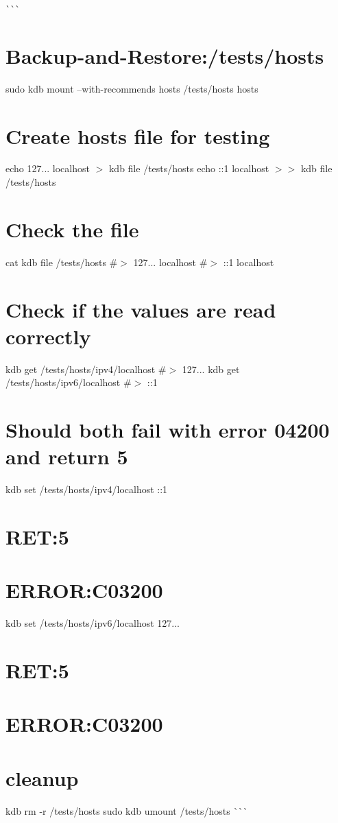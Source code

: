 \`{}\`{}\`{} \hypertarget{autotoc_md268_autotoc_md275}{}\section{Backup-\/and-\/\+Restore\+:/tests/hosts}\label{autotoc_md268_autotoc_md275}
sudo kdb mount --with-\/recommends hosts /tests/hosts hosts\hypertarget{autotoc_md268_autotoc_md276}{}\section{Create hosts file for testing}\label{autotoc_md268_autotoc_md276}
echo \textquotesingle{}127... localhost\textquotesingle{} $>$ {\ttfamily kdb file /tests/hosts} echo \textquotesingle{}\+::1 localhost\textquotesingle{} $>$$>$ {\ttfamily kdb file /tests/hosts}\hypertarget{autotoc_md268_autotoc_md277}{}\section{Check the file}\label{autotoc_md268_autotoc_md277}
cat {\ttfamily kdb file /tests/hosts} \#$>$ 127... localhost \#$>$ \+::1 localhost\hypertarget{autotoc_md268_autotoc_md278}{}\section{Check if the values are read correctly}\label{autotoc_md268_autotoc_md278}
kdb get /tests/hosts/ipv4/localhost \#$>$ 127... kdb get /tests/hosts/ipv6/localhost \#$>$ \+::1\hypertarget{autotoc_md268_autotoc_md279}{}\section{Should both fail with error 04200 and return 5}\label{autotoc_md268_autotoc_md279}
kdb set /tests/hosts/ipv4/localhost \+::1 \hypertarget{autotoc_md268_autotoc_md280}{}\section{R\+E\+T\+:5}\label{autotoc_md268_autotoc_md280}
\hypertarget{autotoc_md268_autotoc_md281}{}\section{E\+R\+R\+O\+R\+:\+C03200}\label{autotoc_md268_autotoc_md281}
kdb set /tests/hosts/ipv6/localhost 127... \hypertarget{autotoc_md268_autotoc_md282}{}\section{R\+E\+T\+:5}\label{autotoc_md268_autotoc_md282}
\hypertarget{autotoc_md268_autotoc_md283}{}\section{E\+R\+R\+O\+R\+:\+C03200}\label{autotoc_md268_autotoc_md283}
\hypertarget{autotoc_md268_autotoc_md284}{}\section{cleanup}\label{autotoc_md268_autotoc_md284}
kdb rm -\/r /tests/hosts sudo kdb umount /tests/hosts \`{}\`{}\`{} 